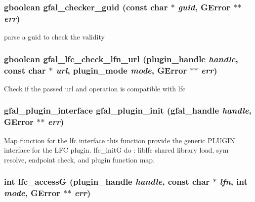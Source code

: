 \subsubsection{\setlength{\rightskip}{0pt plus 5cm}gboolean gfal\_\-checker\_\-guid (const char $\ast$ {\em guid}, GError $\ast$$\ast$ {\em err})}\label{gfal__common__lfc_8c_c7f9448e809d5c82f58288d1491dc2d0}


parse a guid to check the validity 
\subsubsection{\setlength{\rightskip}{0pt plus 5cm}gboolean gfal\_\-lfc\_\-check\_\-lfn\_\-url (plugin\_\-handle {\em handle}, const char $\ast$ {\em url}, plugin\_\-mode {\em mode}, GError $\ast$$\ast$ {\em err})}\label{gfal__common__lfc_8c_dd0bcee4d6721102a3be26faf02d9ad8}


Check if the passed url and operation is compatible with lfc 
\subsubsection{\setlength{\rightskip}{0pt plus 5cm}\bf{gfal\_\-plugin\_\-interface} gfal\_\-plugin\_\-init (gfal\_\-handle {\em handle}, GError $\ast$$\ast$ {\em err})}\label{gfal__common__lfc_8c_0d53404e0e873535bffdfb3197bb73af}


Map function for the lfc interface this function provide the generic PLUGIN interface for the LFC plugin. lfc\_\-init\-G do : liblfc shared library load, sym resolve, endpoint check, and plugin function map. 
\subsubsection{\setlength{\rightskip}{0pt plus 5cm}int lfc\_\-access\-G (plugin\_\-handle {\em handle}, const char $\ast$ {\em lfn}, int {\em mode}, GError $\ast$$\ast$ {\em err})}\label{gfal__common__lfc_8c_3b184ab14ac0fac2931aeb7336989553}


